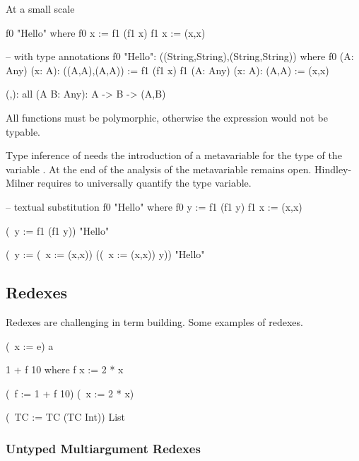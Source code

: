 At a small scale
\begin{alba}
    f0 "Hello" where
        f0 x := f1 (f1 x)
        f1 x := (x,x)

    -- with type annotations
    f0 "Hello": ((String,String),(String,String))
    where
        f0 (A: Any) (x: A): ((A,A),(A,A)) :=
            f1 (f1 x)
        f1 (A: Any) (x: A): (A,A) :=
            (x,x)


    (,): all (A B: Any): A -> B -> (A,B)
\end{alba}
All functions must be polymorphic, otherwise the expression would not be typable.

Type inference of  needs the introduction of a metavariable
 for the type of the variable . At the end of the analysis
of  the metavariable remains open. Hindley-Milner requires to
universally quantify the type variable.

\begin{alba}
    -- textual substitution
    f0 "Hello" where
        f0 y := f1 (f1 y)
        f1 x := (x,x)

    (\ y := f1 (f1 y)) "Hello"

    (\ y := (\ x := (x,x)) ((\ x := (x,x)) y)) "Hello"
\end{alba}











\vskip 5mm
\subsection{Redexes}

Redexes are challenging in term building. Some examples of redexes.

\begin{alba}
    (\ x := e) a

    1 + f 10 where
        f x := 2 * x

    (\ f := 1 + f 10) (\ x := 2 * x)

    (\ TC := TC (TC Int)) List
\end{alba}
%





\subsubsection{Untyped Multiargument Redexes}


